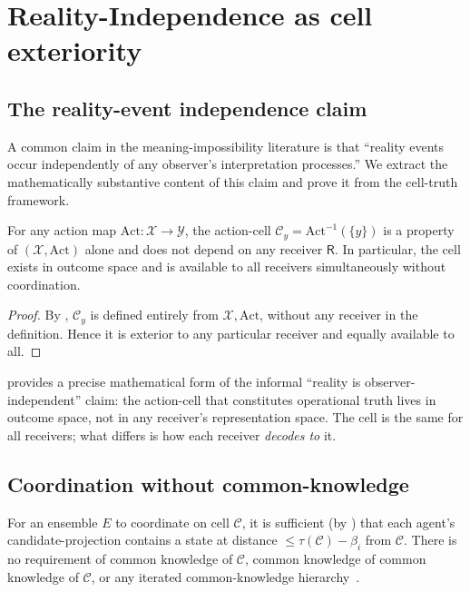 \documentclass[11pt,twocolumn,a4paper]{article}
\newcommand{\X}{\mathcal{X}}
\newcommand{\Y}{\mathcal{Y}}
\newcommand{\Cell}{\mathcal{C}}
\newcommand{\receiver}{\mathsf{R}}
\newcommand{\Action}{\mathrm{Act}}
\begin{document}
\section{Reality-Independence as cell exteriority}
\label{sec:reality-indep}

\subsection{The reality-event independence claim}

A common claim in the meaning-impossibility literature is that
``reality events occur independently of any observer's interpretation
processes.'' We extract the mathematically substantive content of this
claim and prove it from the cell-truth framework.

\begin{theorem}\label{thm:exterior}
For any action map $\Action:\X\to\Y$, the action-cell
$\Cell_y=\Action^{-1}(\{y\})$ is a property of $(\X,\Action)$ alone
and does not depend on any receiver $\receiver$. In particular, the
cell exists in outcome space and is available to all receivers
simultaneously without coordination.
\end{theorem}

\begin{proof}
By , $\Cell_y$ is defined entirely from $\X,\Action$,
without any receiver in the definition. Hence it is exterior to any
particular receiver and equally available to all.
\end{proof}

\begin{remark}\label{rem:re-cell}
 provides a precise mathematical form of the
informal ``reality is observer-independent'' claim: the action-cell
that constitutes operational truth lives in outcome space, not in any
receiver's representation space. The cell is the same for all
receivers; what differs is how each receiver \emph{decodes to} it.
\end{remark}

\subsection{Coordination without common-knowledge}

\begin{theorem}
\label{thm:coord-no-ck}
For an ensemble $E$ to coordinate on cell $\Cell$, it is sufficient
(by ) that each agent's candidate-projection contains
a state at distance $\le\tau(\Cell)-\beta_i$ from $\Cell$. There is
no requirement of common knowledge of $\Cell$, common knowledge of
common knowledge of $\Cell$, or any iterated common-knowledge
hierarchy~\cite{aumann1976,fagin1995}.
\end{theorem}
\end{document}
